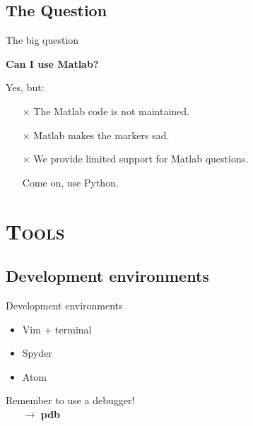 \documentclass[xcolor=x11names, compress,handout]{beamer}
\renewcommand{\(}{\begin{columns}}
\renewcommand{\)}{\end{columns}}
\newcommand{\<}[1]{\begin{column}{#1}}
\renewcommand{\>}{\end{column}}
\begin{document}
\subsection{The Question}
\begin{frame}{The big question}

  \large

  \textbf{\Large Can I use Matlab?}

  \vspace{20pt}
  \pause

  Yes, but:

  \vspace{3pt}

  \begin{itemize}
    \newcommand{\myitem}{\vspace{3pt} \pause \item[{\color{darkgreen}\checkmark}]}
    \newcommand{\baditem}{\vspace{3pt} \pause \item[{\color{red}$\boldsymbol\times$}]}
    \baditem The Matlab code is not maintained.
    \baditem Matlab makes the markers sad.
    \baditem We provide limited support for Matlab questions.
    \myitem Come on, use Python.
  \end{itemize}

\end{frame}


\section{ \scshape Tools}
\subsection{Development environments}
\begin{frame}{Development environments}

  \large
  \begin{itemize}
    \item Vim + terminal
    \item Spyder
    \item Atom
  \end{itemize}

  Remember to use a debugger! \\
  ~ ~ $\rightarrow$ \textbf{pdb}

\end{frame}
\end{document}
